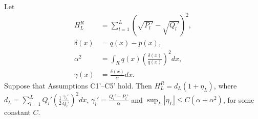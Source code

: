 \documentclass{article}
\begin{document}
\begin{lemma}
\label{prop:discrete_hellinger_chi_square}
Let
\begin{align*}
H^R_L & = \sum_{l=1}^L \left( \sqrt{P_l'} - \sqrt{Q_l'} \right)^2, \\
%
\delta(x) & = q(x) - p(x), \\
%
\alpha^2 & =  \int_R q(x) \left( \frac{\delta(x)}{q(x)} \right)^2 dx, \\
%
\gamma(x) & = \frac{\delta(x)}{\alpha} dx.
\end{align*}
Suppose that Assumptions C1'--C5' hold. Then $H^R_L = d_L ( 1 + \eta_L )$,
where $d_L = \sum_{l=1}^L Q_l' \left( \frac{1}{2} \frac{\gamma_l'}{Q_l'} \right)^2 dx$, $\gamma_l' = \frac{Q_l'-P_l'}{\alpha}$ and $\sup_L |\eta_L | \leq C(\alpha + \alpha^2)$, for some constant $C$.%
\end{lemma}
\end{document}
